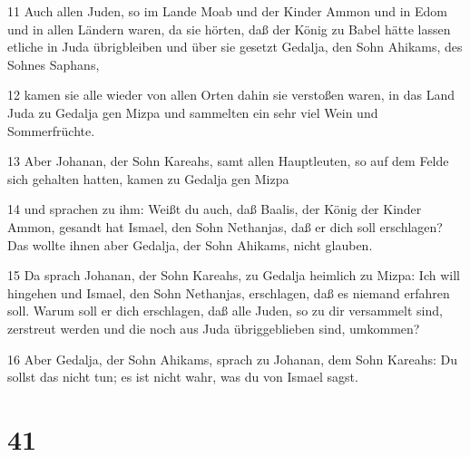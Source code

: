 \par 11 Auch allen Juden, so im Lande Moab und der Kinder Ammon und in Edom und in allen Ländern waren, da sie hörten, daß der König zu Babel hätte lassen etliche in Juda übrigbleiben und über sie gesetzt Gedalja, den Sohn Ahikams, des Sohnes Saphans,
\par 12 kamen sie alle wieder von allen Orten dahin sie verstoßen waren, in das Land Juda zu Gedalja gen Mizpa und sammelten ein sehr viel Wein und Sommerfrüchte.
\par 13 Aber Johanan, der Sohn Kareahs, samt allen Hauptleuten, so auf dem Felde sich gehalten hatten, kamen zu Gedalja gen Mizpa
\par 14 und sprachen zu ihm: Weißt du auch, daß Baalis, der König der Kinder Ammon, gesandt hat Ismael, den Sohn Nethanjas, daß er dich soll erschlagen? Das wollte ihnen aber Gedalja, der Sohn Ahikams, nicht glauben.
\par 15 Da sprach Johanan, der Sohn Kareahs, zu Gedalja heimlich zu Mizpa: Ich will hingehen und Ismael, den Sohn Nethanjas, erschlagen, daß es niemand erfahren soll. Warum soll er dich erschlagen, daß alle Juden, so zu dir versammelt sind, zerstreut werden und die noch aus Juda übriggeblieben sind, umkommen?
\par 16 Aber Gedalja, der Sohn Ahikams, sprach zu Johanan, dem Sohn Kareahs: Du sollst das nicht tun; es ist nicht wahr, was du von Ismael sagst.

\chapter{41}

